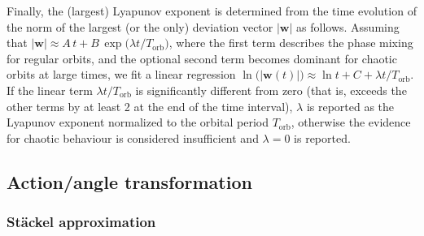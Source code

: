 \documentclass[12pt]{article}
\begin{document}
Finally, the (largest) Lyapunov exponent is determined from the time evolution of the norm of the largest (or the only) deviation vector $|\boldsymbol{w}|$ as follows. Assuming that $|\boldsymbol w| \approx A\,t + B\,\exp\big(\lambda t / T_\mathrm{orb}\big)$, where the first term describes the phase mixing for regular orbits, and the optional second term becomes dominant for chaotic orbits at large times, we fit a linear regression $\ln\big(|\boldsymbol{w}(t)|\big) \approx \ln t + C + \lambda t / T_\mathrm{orb}$. If the linear term $\lambda t / T_\mathrm{orb}$ is significantly different from zero (that is, exceeds the other terms by at least 2 at the end of the time interval), $\lambda$ is reported as the Lyapunov exponent normalized to the orbital period $T_\mathrm{orb}$, otherwise the evidence for chaotic behaviour is considered insufficient and $\lambda=0$ is reported.


\subsection{Action/angle transformation}  \label{sec:ActionsDetails}

\subsubsection{St\"ackel approximation}  \label{sec:ActionsStaeckelDetails}
\end{document}

